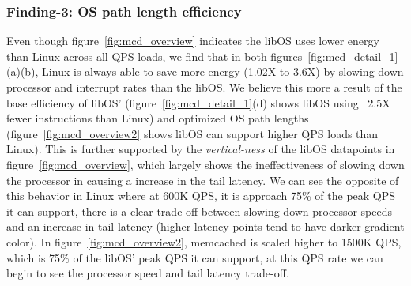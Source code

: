 
\subsubsection{Finding-3: OS path length efficiency} \label{sec:f3}
Even though figure~\ref{fig:mcd_overview} indicates the libOS uses lower energy than Linux across all QPS loads, we find that in both figures~\ref{fig:mcd_detail_1}(a)(b), Linux is always able to save more energy (1.02X to 3.6X) by slowing down processor and interrupt rates than the libOS. We believe this more a result of the base efficiency of libOS' (figure~\ref{fig:mcd_detail_1}(d) shows libOS using ~2.5X fewer instructions than Linux) and optimized OS path lengths (figure~\ref{fig:mcd_overview2} shows libOS can support higher QPS loads than Linux). This is further supported by the \textit{vertical-ness} of the libOS datapoints in figure~\ref{fig:mcd_overview}, which largely shows the ineffectiveness of slowing down the processor in causing a increase in the tail latency. We can see the opposite of this behavior in Linux where at 600K QPS, it is approach 75\% of the peak QPS it can support, there is a clear trade-off between slowing down processor speeds and an increase in tail latency (higher latency points tend to have darker gradient color). In figure~\ref{fig:mcd_overview2}, memcached is scaled higher to 1500K QPS, which is 75\% of the libOS' peak QPS it can support, at this QPS rate we can begin to see the processor speed and tail latency trade-off.




